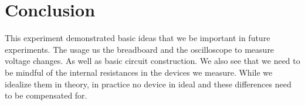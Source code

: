 \documentclass[11pt]{article}
\numberwithin{equation}{section}
\begin{document}
\section{Conclusion}
This experiment demonstrated basic ideas that we be important in future experiments. The usage us the breadboard and the oscilloscope to measure voltage changes. As well as basic circuit construction. We also see that we need to be mindful of the internal resistances in the devices we measure. While we idealize them in theory, in practice no device in ideal and these differences need to be compensated for. 
\end{document}
